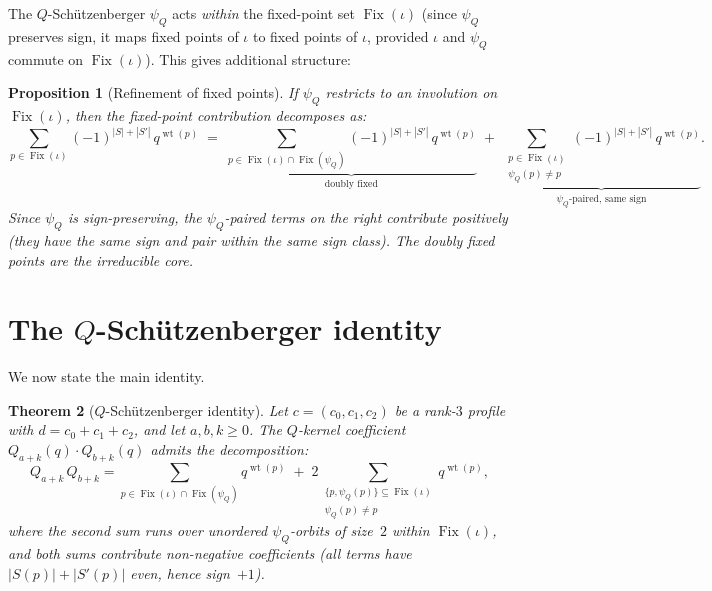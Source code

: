 \documentclass[11pt]{article}
\DeclareMathOperator{\wt}{wt}
\DeclareMathOperator{\Fix}{Fix}
\theoremstyle{plain}
\newtheorem{theorem}{Theorem}
\newtheorem{proposition}[theorem]{Proposition}
\theoremstyle{definition}
\begin{document}
The $Q$-Sch\"utzenberger $\psi_Q$ acts \emph{within} the
fixed-point set $\Fix(\iota)$ (since $\psi_Q$ preserves sign,
it maps fixed points of $\iota$ to fixed points of $\iota$,
provided $\iota$ and $\psi_Q$ commute on $\Fix(\iota)$).
This gives additional structure:

\begin{proposition}[Refinement of fixed points]
\label{prop:refinement}
If\/ $\psi_Q$ restricts to an involution on $\Fix(\iota)$,
then the fixed-point contribution decomposes as:
\[
  \sum_{p \in \Fix(\iota)} (-1)^{|S|+|S'|}\, q^{\wt(p)}
  \;=\;
  \underbrace{
    \sum_{p \in \Fix(\iota) \cap \Fix(\psi_Q)}
    (-1)^{|S|+|S'|}\, q^{\wt(p)}
  }_{\text{doubly fixed}}
  \;+\;
  \underbrace{
    \sum_{\substack{p \in \Fix(\iota) \\ \psi_Q(p) \neq p}}
    (-1)^{|S|+|S'|}\, q^{\wt(p)}
  }_{\text{$\psi_Q$-paired, same sign}}.
\]
Since $\psi_Q$ is sign-preserving, the $\psi_Q$-paired terms
on the right contribute \emph{positively} (they have the same
sign and pair within the same sign class).  The doubly fixed
points are the irreducible core.
\end{proposition}


\section{The $Q$-Sch\"utzenberger identity}
\label{sec:identity}

We now state the main identity.

\begin{theorem}[$Q$-Sch\"utzenberger identity]
\label{thm:Q-schutz-identity}
Let $c = (c_0, c_1, c_2)$ be a rank-$3$ profile with
$d = c_0 + c_1 + c_2$, and let $a, b, k \geq 0$.
The $Q$-kernel coefficient $Q_{a+k}(q) \cdot Q_{b+k}(q)$
admits the decomposition:
\begin{equation}\label{eq:Q-schutz-identity}
  \boxed{\;
  Q_{a+k}\, Q_{b+k}
  = \sum_{p \in \Fix(\iota) \cap \Fix(\psi_Q)}
    q^{\wt(p)}
  \;+\;
  2 \sum_{\substack{\{p, \psi_Q(p)\}
    \subseteq \Fix(\iota) \\ \psi_Q(p) \neq p}}
    q^{\wt(p)},
  \;}
\end{equation}
where the second sum runs over unordered $\psi_Q$-orbits of
size~$2$ within $\Fix(\iota)$, and both sums contribute
non-negative coefficients (all terms have
$|S(p)| + |S'(p)|$ even, hence sign~$+1$).
\end{theorem}
\end{document}

